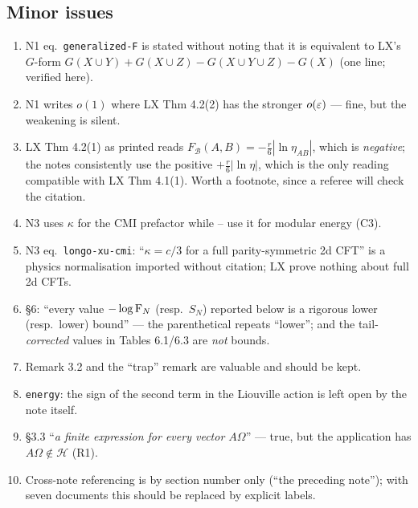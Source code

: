 \documentclass[11pt]{article}
\newcommand{\NI}{N1}\newcommand{\NII}{N2}\newcommand{\NIII}{N3}
\renewcommand{\cB}{\mathcal B}
\begin{document}
\subsection{Minor issues}
\begin{enumerate}[leftmargin=1.6em]
\item \NI{} eq.~\texttt{generalized-F} is stated without noting that it is equivalent to LX's $G$-form
$G(X{\cup}Y)+G(X{\cup}Z)-G(X{\cup}Y{\cup}Z)-G(X)$ (one line; verified here).
\item \NI{} writes $o(1)$ where LX Thm 4.2(2) has the stronger $o(\varepsilon)$ --- fine, but the weakening is silent.
\item LX Thm 4.2(1) as printed reads $F_\cB(A,B)=-\frac r6|\ln\eta_{AB}|$, which is \emph{negative}; the notes
consistently use the positive $+\frac r6|\ln\eta|$, which is the only reading compatible with LX Thm 4.1(1).
Worth a footnote, since a referee will check the citation.
\item \NIII{} uses $\kappa$ for the CMI prefactor while \NV--\NVII{} use it for modular energy (C3).
\item \NIII{} eq.~\texttt{longo-xu-cmi}: ``$\kappa=c/3$ for a full parity-symmetric 2d CFT'' is a physics normalisation
imported without citation; LX prove nothing about full 2d CFTs.
\item \NV{} \S6: ``every value $-\log\operatorname{F}_N$ (resp.\ $S_N$) reported below is a rigorous lower (resp.\ lower) bound''
--- the parenthetical repeats ``lower''; and the tail-\emph{corrected} values in Tables 6.1/6.3 are \emph{not} bounds.
\item \NV{} Remark 3.2 and the ``trap'' remark are valuable and should be kept.
\item \NVI{} \texttt{energy}: the sign of the second term in the Liouville action is left open by the note itself.
\item \NVII{} \S3.3 ``\emph{a finite expression for every vector $A\Omega$}'' --- true, but the application has
$A\Omega\notin\mathcal H$ (R1).
\item Cross-note referencing is by section number only (``the preceding note''); with seven documents this should be
replaced by explicit labels.
\end{enumerate}
\end{document}
